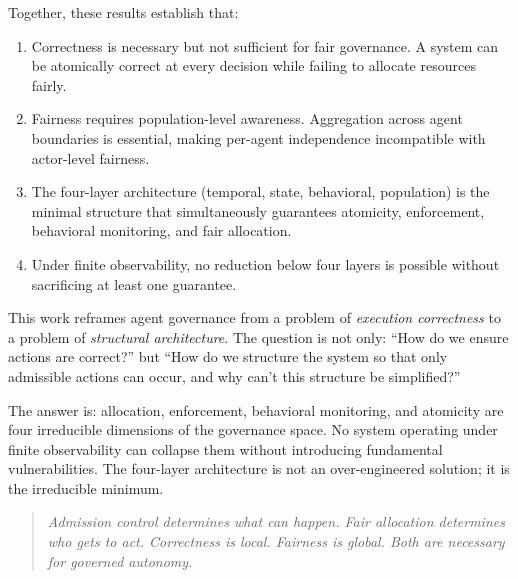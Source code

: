 \documentclass[11pt]{article}
\begin{document}
Together, these results establish that:

\begin{enumerate}[label=(\roman*),noitemsep]
  \item Correctness is necessary but not sufficient for fair governance. A system can be atomically correct at every decision while failing to allocate resources fairly.

  \item Fairness requires population-level awareness. Aggregation across agent boundaries is essential, making per-agent independence incompatible with actor-level fairness.

  \item The four-layer architecture (temporal, state, behavioral, population) is the minimal structure that simultaneously guarantees atomicity, enforcement, behavioral monitoring, and fair allocation.

  \item Under finite observability, no reduction below four layers is possible without sacrificing at least one guarantee.
\end{enumerate}

This work reframes agent governance from a problem of \emph{execution correctness} to a problem of \emph{structural architecture}. The question is not only: ``How do we ensure actions are correct?'' but ``How do we structure the system so that only admissible actions can occur, and why can't this structure be simplified?''

The answer is: allocation, enforcement, behavioral monitoring, and atomicity are four irreducible dimensions of the governance space. No system operating under finite observability can collapse them without introducing fundamental vulnerabilities. The four-layer architecture is not an over-engineered solution; it is the irreducible minimum.

\begin{quote}
\textit{Admission control determines what can happen. Fair allocation determines who gets to act. Correctness is local. Fairness is global. Both are necessary for governed autonomy.}
\end{quote}



\end{document}
